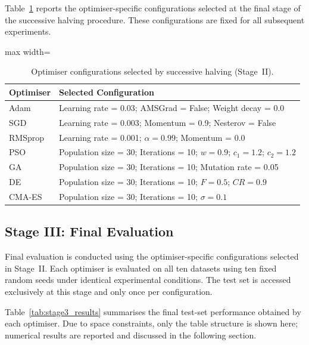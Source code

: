 \documentclass[conference]{IEEEtran}
\begin{document}
Table~\ref{tab:sh_selected} reports the optimiser-specific configurations
selected at the final stage of the successive halving procedure.
These configurations are fixed for all subsequent experiments.

\begin{table}[t]
\centering
\caption{Optimiser configurations selected by successive halving (Stage~II).}
\label{tab:sh_selected}
\begin{adjustbox}{max width=\linewidth}
\begin{tabular}{ll}
\toprule
\textbf{Optimiser} & \textbf{Selected Configuration} \\
\midrule
Adam &
Learning rate = 0.03; AMSGrad = False; Weight decay = 0.0 \\

SGD &
Learning rate = 0.003; Momentum = 0.9; Nesterov = False \\

RMSprop &
Learning rate = 0.001; $\alpha = 0.99$; Momentum = 0.0 \\

PSO &
Population size = 30; Iterations = 10;
$w = 0.9$; $c_1 = 1.2$; $c_2 = 1.2$ \\

GA &
Population size = 30; Iterations = 10;
Mutation rate = 0.05 \\

DE &
Population size = 30; Iterations = 10;
$F = 0.5$; $CR = 0.9$ \\

CMA-ES &
Population size = 30; Iterations = 10;
$\sigma = 0.1$ \\
\bottomrule
\end{tabular}
\end{adjustbox}
\end{table}

\subsection{Stage III: Final Evaluation}

Final evaluation is conducted using the optimiser-specific configurations
selected in Stage~II.
Each optimiser is evaluated on all ten datasets using ten fixed random seeds
under identical experimental conditions.
The test set is accessed exclusively at this stage and only once per
configuration.

Table~\ref{tab:stage3_results} summarises the final test-set performance obtained
by each optimiser.
Due to space constraints, only the table structure is shown here; numerical
results are reported and discussed in the following section.
\end{document}
